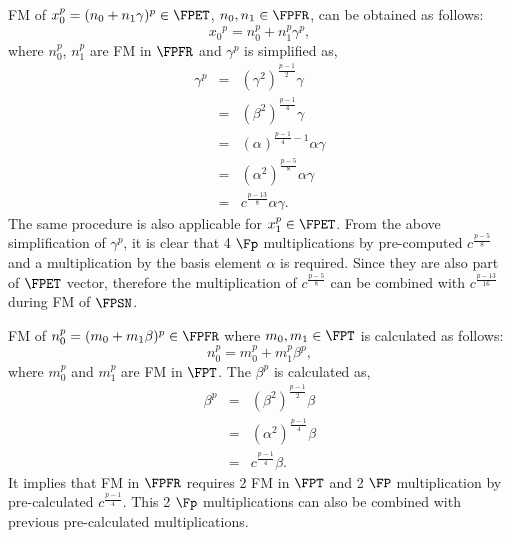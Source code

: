 FM of $x_0^p = (n_0 + n_1 \gamma)^p \in \FPET$, $n_0, n_1 \in \FPFR$, can be obtained as follows:
\begin{equation}
{x_0}^p =  n_0^p+n_1^p\gamma^p, \nonumber
\end{equation}
where $n_0^p$, $n_1^p$ are FM in $\FPFR$ and $\gamma^p$ is simplified as,
\begin{eqnarray}
\gamma^p & = & (\gamma^2)^{\frac{p-1}{2}}\gamma  \nonumber \\
& = & (\beta^2)^{\frac{p-1}{4}}\gamma \nonumber \\
& = & (\alpha)^{\frac{p-1}{4}-1}\alpha\gamma \nonumber \\
& = & (\alpha^2)^{\frac{p-5}{8}}\alpha\gamma \nonumber \\
& = & c^{\frac{p-13}{8}}\alpha\gamma .
\end{eqnarray}
The same procedure is also applicable for $x_1^p \in \FPET$.
From the above simplification of $\gamma^p$, it is clear that  4 $\Fp$ multiplications by  pre-computed $c^{\frac{p-5}{8}}$ and a multiplication by the basis element $\alpha$ is required. Since they are also part of $\FPET$ vector, therefore the multiplication of $c^{\frac{p-5}{8}}$ can be combined with  $c^{\frac{p-13}{16}}$ during FM of $\FPSN$.

FM of $n_0^p = (m_0 + m_1 \beta)^p \in \FPFR$ where $m_0, m_1 \in \FPT$ is calculated as follows:
\begin{equation}
\label{fm4}
 n_0^p  =  m_0^p + m_1^p {\beta}^p,
\end{equation}
 where $m_0^p$ and $m_1^p$ are FM in $\FPT$. The $\beta^p$ is calculated as,
 \begin{eqnarray}
  {\beta}^p  & = & {(\beta^2)}^{\frac{p-1}{2}} \beta \nonumber \\
  &= &{(\alpha^2)}^{\frac{p-1}{4}} \beta \nonumber \\
  & = & c^{\frac{p-1}{4}} \beta. \nonumber
 \end{eqnarray}
 It implies that FM in $\FPFR$ requires 2 FM in $\FPT$ and 2 $\FP$ multiplication by pre-calculated $c^{\frac{p-1}{4}}$. This 2 $\Fp$ multiplications can also be combined with previous pre-calculated multiplications.
 
